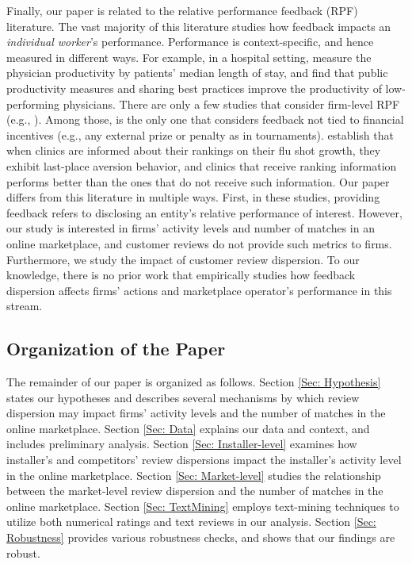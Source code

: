 \documentclass[msom,blindrev]{informs3}
\begin{document}
	
	
	
	Finally, our paper is related to the relative performance feedback (RPF) literature. The vast majority of this literature studies how feedback impacts an \emph{individual worker}'s performance. Performance is context-specific, and hence measured in different ways. For example, in a hospital setting, \cite{song2017closing} measure the physician productivity by patients' median length of stay, and find that public productivity measures and sharing best practices improve the productivity of low-performing physicians. There are only a few studies that consider firm-level RPF (e.g., \cite{josse2013}). Among those, \cite{staats} is the only one that considers feedback not tied to financial incentives (e.g., any external prize or penalty as in tournaments). \cite{staats} establish that when clinics are informed about their rankings on their flu shot growth, they exhibit last-place aversion behavior, and clinics that receive ranking information performs better than the ones that do not receive such information. Our paper differs from this literature in multiple ways. First, in these studies, providing feedback refers to disclosing an entity's relative performance of interest. However, our study is interested in firms' activity levels and number of matches in an online marketplace, and customer reviews do not provide such metrics to firms. Furthermore, we study the impact of customer review dispersion. To our knowledge, there is no prior work that empirically studies how feedback dispersion affects firms' actions and marketplace operator's performance in this stream.
	
\subsection{Organization of the Paper}
	
	The remainder of our paper is organized as follows. Section \ref{Sec: Hypothesis} states our hypotheses and describes several mechanisms by which review dispersion may impact firms' activity levels and the number of matches in the online marketplace. Section \ref{Sec: Data} explains our data and context, and includes preliminary analysis. Section \ref{Sec: Installer-level} examines how installer's and competitors' review dispersions impact the installer's activity level in the online marketplace. Section \ref{Sec: Market-level} studies the relationship between the market-level review dispersion and the number of matches in the online marketplace. Section \ref{Sec: TextMining} employs text-mining techniques to utilize both numerical ratings and text reviews in our analysis. Section \ref{Sec: Robustness}  provides various robustness checks, and shows that our findings are robust.
	
\end{document}
